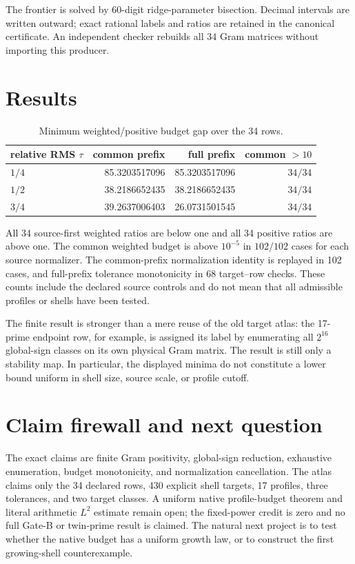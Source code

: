 \documentclass[11pt]{article}
\begin{document}
The frontier is solved by 60-digit ridge-parameter bisection.  Decimal
intervals are written outward; exact rational labels and ratios are retained
in the canonical certificate.  An independent checker rebuilds all 34 Gram
matrices without importing this producer.

\section{Results}

\begin{table}[t]
\centering\small
\caption{Minimum weighted/positive budget gap over the 34 rows.}
\begin{tabular}{lrrr}
\toprule
relative RMS $\tau$ & common prefix & full prefix & common $>10$\\
\midrule
$1/4$ & 85.3203517096 & 85.3203517096 & $34/34$\\
$1/2$ & 38.2186652435 & 38.2186652435 & $34/34$\\
$3/4$ & 39.2637006403 & 26.0731501545 & $34/34$\\
\bottomrule
\end{tabular}
\end{table}

All 34 source-first weighted ratios are below one and all 34 positive ratios
are above one.  The common weighted budget is above $10^{-5}$ in $102/102$
cases for each source normalizer.  The common-prefix normalization identity
is replayed in 102 cases, and full-prefix tolerance monotonicity in 68
target--row checks.  These counts include the declared source controls and
do not mean that all admissible profiles or shells have been tested.

The finite result is stronger than a mere reuse of the old target atlas: the
17-prime endpoint row, for example, is assigned its label by enumerating all
$2^{16}$ global-sign classes on its own physical Gram matrix.  The result is
still only a stability map.  In particular, the displayed minima do not
constitute a lower bound uniform in shell size, source scale, or profile
cutoff.

\section{Claim firewall and next question}

The exact claims are finite Gram positivity, global-sign reduction,
exhaustive enumeration, budget monotonicity, and normalization cancellation.
The atlas claims only the 34 declared rows, 430 explicit shell targets, 17
profiles, three tolerances, and two target classes.  A uniform native
profile-budget theorem and literal arithmetic $L^2$ estimate remain open;
the fixed-power credit is zero and no full Gate-B or twin-prime result is
claimed.  The natural next project is to test whether the native budget has a
uniform growth law, or to construct the first growing-shell counterexample.
\end{document}

